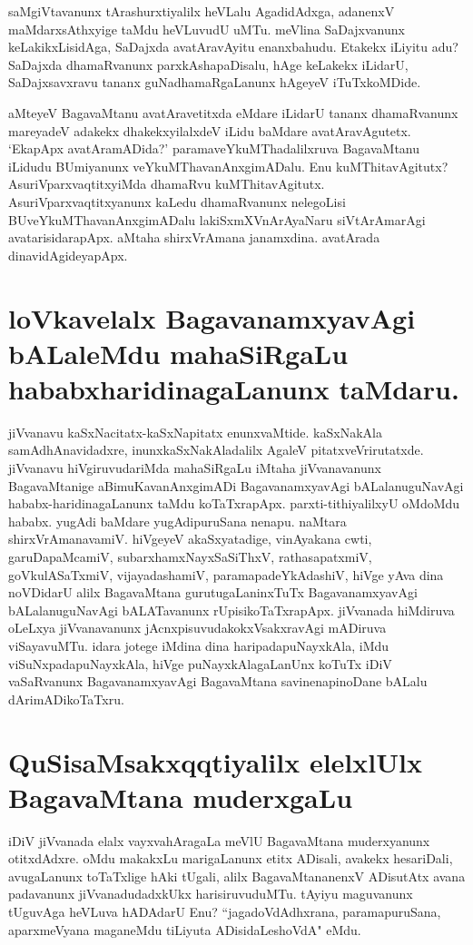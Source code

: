 saMgiVtavanunx tArashurxtiyalilx heVLalu AgadidAdxga, adanenxV maMdarxsAthxyige taMdu heVLuvudU uMTu. meVlina SaDajxvanunx keLakikxLisidAga, SaDajxda avatAravAyitu enanxbahudu. Etakekx iLiyitu adu? SaDajxda dhamaRvanunx parxkAshapaDisalu, hAge keLakekx iLidarU, SaDajxsavxravu tananx guNadhamaRgaLanunx hAgeyeV iTuTxkoMDide. 

aMteyeV BagavaMtanu avatAravetitxda eMdare iLidarU tananx dhamaRvanunx mareyadeV adakekx dhakekxyilalxdeV iLidu baMdare avatAravAgutetx. `EkapApx avatAramADida?' paramaveYkuMThadalilxruva BagavaMtanu iLidudu BUmiyanunx veYkuMThavanAnxgimADalu. Enu kuMThitavAgitutx? AsuriVparxvaqtitxyiMda dhamaRvu kuMThitavAgitutx. AsuriVparxvaqtitxyanunx kaLedu dhamaRvanunx nelegoLisi BUveYkuMThavanAnxgimADalu lakiSxmXVnArAyaNaru siVtArAmarAgi avatarisidarapApx. aMtaha shirxVrAmana janamxdina. avatArada dinavidAgideyapApx. 

\section*{loVkavelalx BagavanamxyavAgi bALaleMdu mahaSiRgaLu hababxharidinagaLanunx taMdaru.} 

jiVvanavu kaSxNacitatx-kaSxNapitatx enunxvaMtide. kaSxNakAla samAdhAnavidadxre, inunxkaSxNakAladalilx AgaleV pitatxveVrirutatxde. jiVvanavu hiVgiruvudariMda mahaSiRgaLu iMtaha jiVvanavanunx BagavaMtanige aBimuKavanAnxgimADi BagavanamxyavAgi bALalanuguNavAgi hababx-haridinagaLanunx taMdu koTaTxrapApx. parxti-tithiyalilxyU oMdoMdu hababx. yugAdi baMdare yugAdipuruSana nenapu. naMtara shirxVrAmanavamiV. hiVgeyeV akaSxyatadige, vinAyakana cwti, garuDapaMcamiV, subarxhamxNayxSaSiThxV, rathasapatxmiV, goVkulASaTxmiV, vijayadashamiV, paramapadeYkAdashiV, hiVge yAva dina noVDidarU alilx BagavaMtana gurutugaLaninxTuTx BagavanamxyavAgi bALalanuguNavAgi bALATavanunx rUpisikoTaTxrapApx. jiVvanada hiMdiruva oLeLxya jiVvanavanunx jAcnxpisuvudakokxVsakxravAgi mADiruva viSayavuMTu. idara jotege iMdina dina haripadapuNayxkAla, iMdu viSuNxpadapuNayxkAla, hiVge puNayxkAlagaLanUnx koTuTx iDiV vaSaRvanunx BagavanamxyavAgi BagavaMtana savinenapinoDane bALalu dArimADikoTaTxru. 

\section*{QuSisaMsakxqqtiyalilx elelxlUlx BagavaMtana muderxgaLu}

iDiV jiVvanada elalx vayxvahAragaLa meVlU BagavaMtana muderxyanunx otitxdAdxre. oMdu makakxLu marigaLanunx etitx ADisali, avakekx hesariDali, avugaLanunx toTaTxlige hAki tUgali, alilx BagavaMtananenxV ADisutAtx avana padavanunx jiVvanadudadxkUkx harisiruvuduMTu. tAyiyu maguvanunx tUguvAga heVLuva hADAdarU Enu? ``jagadoVdAdhxrana, paramapuruSana, aparxmeVyana maganeMdu tiLiyuta ADisidaLeshoVdA" eMdu. 

